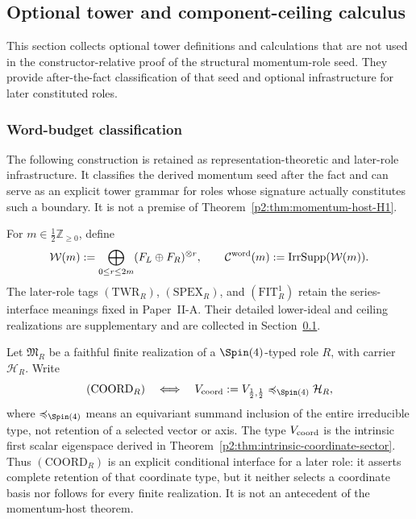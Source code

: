 \documentclass[11pt,a4paper]{article}
\begin{document}
\subsection{Optional tower and component-ceiling calculus}
\label{p2b:app:optional-tower-machinery}
This section collects optional tower definitions and calculations that are
not used in the constructor-relative proof of the structural momentum-role
seed.  They provide after-the-fact classification of that seed and optional
infrastructure for later constituted roles.

\subsubsection{Word-budget classification}
\label{p2:subsec:spectral-exhaustivity-arbitration}

The following construction is retained as representation-theoretic and
later-role infrastructure.  It classifies the derived momentum seed after the
fact and can serve as an explicit tower grammar for roles whose signature
actually constitutes such a boundary.  It is not a premise of
Theorem~\ref{p2:thm:momentum-host-H1}.

\begin{definition}
\label{p2:def:spex-fit}
For \(m\in\frac12\mathbb Z_{\ge0}\), define
\[
 \mathcal W(m):=\bigoplus_{0\le r\le2m}(F_L\oplus F_R)^{\otimes r},
 \qquad
 \mathcal C^{\rm word}(m):=\operatorname{IrrSupp}(\mathcal W(m)).
\]
The later-role tags \((\mathrm{TWR}_R)\), \((\mathrm{SPEX}_R)\), and
\((\mathrm{FIT}_R^1)\) retain the series-interface meanings fixed in
Paper~II-A.  Their detailed lower-ideal and ceiling
realizations are supplementary and are collected in
Section~\ref{p2b:app:optional-tower-machinery}.
\end{definition}

\begin{definition}
\label{p2:def:coord-role-antecedent}
Let \(\mathfrak M_R\) be a faithful finite realization of a
\(\Spin(4)\)-typed role \(R\), with carrier \(\mathcal H_R\).  Write
\[
 (\mathrm{COORD}_R)
 \quad\Longleftrightarrow\quad
 V_{\rm coord}:=V_{\frac12,\frac12}
 \preccurlyeq_{\Spin(4)}\mathcal H_R,
\]
where \(\preccurlyeq_{\Spin(4)}\) means an equivariant summand inclusion of
the entire irreducible type, not retention of a selected vector or axis.
The type \(V_{\rm coord}\) is the intrinsic first scalar eigenspace derived in
Theorem~\ref{p2:thm:intrinsic-coordinate-sector}.  Thus
\((\mathrm{COORD}_R)\) is an explicit conditional interface for a later role:
it asserts complete retention of that coordinate type, but it neither selects
a coordinate basis nor follows for every finite realization.  It is not an
antecedent of the momentum-host theorem.
\end{definition}
\end{document}
